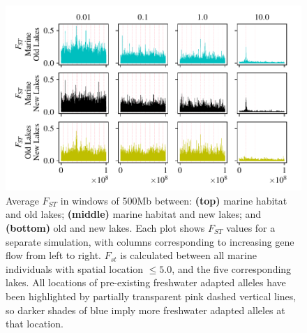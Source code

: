 \documentclass{article}
\begin{document}
\begin{figure}
    \begin{center}
          \includegraphics[width=1.0\linewidth]{Final_Plots/Fst_Genome_faa0_5_500.pdf}
          \caption{
        Average $F_{ST}$ in windows of 500Mb between:
                \textbf{(top)} marine habitat and old lakes;
                \textbf{(middle)} marine habitat and new lakes; and
                \textbf{(bottom)} old and new lakes.
                Each plot shows $F_{ST}$ values for a separate simulation,
                with columns corresponding to increasing gene flow from left to right.
        $F_{st}$ is calculated between all marine individuals with spatial location $\le 5.0$, and the five corresponding lakes.
        All locations of pre-existing freshwater adapted alleles have been highlighted by 
        partially transparent pink dashed vertical lines, so darker shades of blue imply more 
        freshwater adapted alleles at that location.
        }
          \label{fig:fst_5lakes}
    \end{center}
\end{figure}
\end{document}
